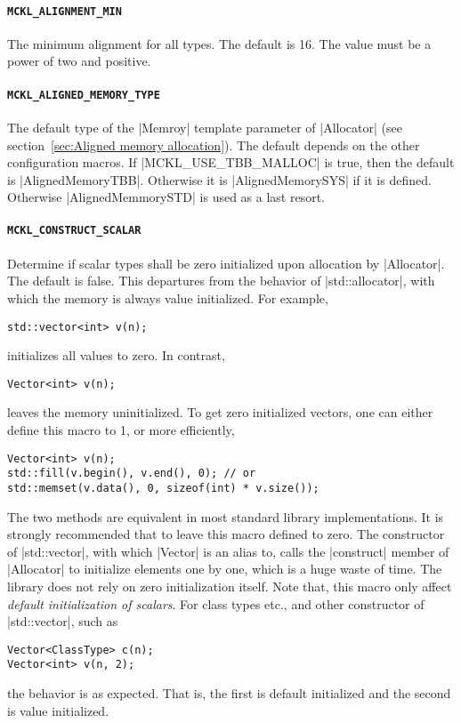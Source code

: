 \paragraph{\texttt{MCKL\_ALIGNMENT\_MIN}} The minimum alignment for all types.
The default is 16. The value must be a power of two and positive.

\paragraph{\texttt{MCKL\_ALIGNED\_MEMORY\_TYPE}} The default type of the
|Memroy| template parameter of |Allocator| (see section~\ref{sec:Aligned memory
allocation}). The default depends on the other configuration macros. If
|MCKL_USE_TBB_MALLOC| is true, then the default is |AlignedMemoryTBB|.
Otherwise it is |AlignedMemorySYS| if it is defined. Otherwise
|AlignedMemmorySTD| is used as a last resort.

\paragraph{\texttt{MCKL\_CONSTRUCT\_SCALAR}} Determine if scalar types shall be
zero initialized upon allocation by |Allocator|. The default is false. This
departures from the behavior of |std::allocator|, with which the memory is
always value initialized. For example,
\begin{verbatim}
std::vector<int> v(n);
\end{verbatim}
initializes all values to zero. In contrast,
\begin{verbatim}
Vector<int> v(n);
\end{verbatim}
leaves the memory uninitialized. To get zero initialized vectors, one can
either define this macro to 1, or more efficiently,
\begin{verbatim}
Vector<int> v(n);
std::fill(v.begin(), v.end(), 0); // or
std::memset(v.data(), 0, sizeof(int) * v.size());
\end{verbatim}
The two methods are equivalent in most standard library implementations. It is
strongly recommended that to leave this macro defined to zero. The constructor
of |std::vector|, with which |Vector| is an alias to, calls the |construct|
member of |Allocator| to initialize elements one by one, which is a huge waste
of time. The library does not rely on zero initialization itself. Note that,
this macro only affect \emph{default initialization of scalars}. For class
types etc., and other constructor of |std::vector|, such as
\begin{verbatim}
Vector<ClassType> c(n);
Vector<int> v(n, 2);
\end{verbatim}
the behavior is as expected. That is, the first is default initialized and the
second is value initialized.

